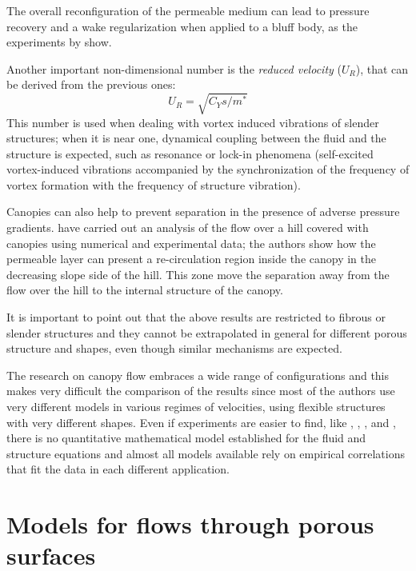 The overall reconfiguration of the permeable medium can lead to pressure recovery and a wake regularization when applied to a bluff body, as the experiments by \citet{gosselin2011drag} show.

Another important non-dimensional number is the \textit{reduced velocity} ($U_R$), that can be derived from the previous ones:
$$ U_R = \sqrt{C_Y s / m^*}$$
This number is used when dealing with vortex induced vibrations of slender structures; when it is near one, dynamical coupling between the fluid and the structure is expected, such as resonance or lock-in phenomena (self-excited vortex-induced vibrations accompanied by the synchronization of the frequency of vortex formation with the frequency of structure vibration).

Canopies can also help to prevent separation in the presence of adverse pressure gradients. \citet{belcher2012wind} have carried out an analysis of the flow over a hill covered with canopies using numerical and experimental data; the authors show how the permeable layer can present a re-circulation region inside the canopy in the decreasing slope side of the hill. This zone move the separation away from the flow over the hill to the internal structure of the canopy.

It is important to point out that the above results are restricted to fibrous or slender structures and they cannot be extrapolated in general for different porous structure and shapes, even though similar mechanisms are expected.

The research on canopy flow embraces a wide range of configurations and this makes very difficult the comparison of the results since most of the authors use very different models in various regimes of velocities, using flexible structures with very different shapes.
Even if experiments are easier to find, like \citet{segalini2011experimental}, \citet{segalini2013scaling}, \citet{maza2013coupled}, \citet{barsu2016drag} and \citet{alvarado2017nature}, there is no quantitative mathematical model established for the fluid and structure equations and almost all models available rely on empirical correlations that fit the data in each different application.


\section{Models for flows through porous surfaces}
\label{ch:model_porous}

